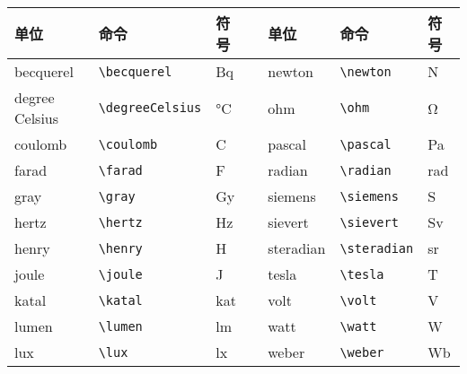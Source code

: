 \begin{table}[htbp]
\centering{}
\begin{tabular}{lllp{10pt}lll}
\toprule
单位    & 命令  & 符号  &   & 单位    & 命令  & 符号  \\
\midrule
becquerel       & \verb|\becquerel|     & \si{\becquerel}       & & newton      & \verb|\newton|    & \si{\newton} \\
degree Celsius  & \verb|\degreeCelsius| & \si{\degreeCelsius}   & & ohm         & \verb|\ohm|       & \si{\ohm}\\
coulomb         & \verb|\coulomb|       & \si{\coulomb}         & & pascal      & \verb|\pascal|    & \si{\pascal}\\
farad           & \verb|\farad|         & \si{\farad}           & & radian      & \verb|\radian|    & \si{\radian} \\
gray            & \verb|\gray|          & \si{\gray}            & & siemens     & \verb|\siemens|   & \si{\siemens}    \\
hertz           & \verb|\hertz|         & \si{\hertz}           & & sievert     & \verb|\sievert|   & \si{\sievert}\\
henry           & \verb|\henry|         & \si{\henry}           & & steradian   & \verb|\steradian| & \si{\steradian}\\
joule           & \verb|\joule|         & \si{\joule}           & & tesla       & \verb|\tesla|     & \si{\tesla}\\
katal           & \verb|\katal|         & \si{\katal}           & & volt        & \verb|\volt|      & \si{\volt}\\
lumen           & \verb|\lumen|         & \si{\lumen}           & & watt        & \verb|\watt|      & \si{\watt}\\
lux             & \verb|\lux|           & \si{\lux}             & & weber       & \verb|\weber|     & \si{\weber}\\
\bottomrule
\end{tabular}
\end{table}
%
